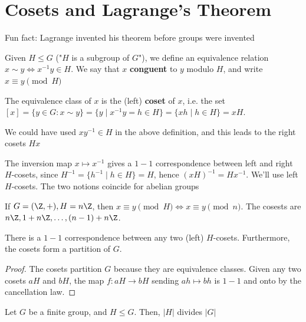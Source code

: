 \section{Cosets and Lagrange's Theorem}

Fun fact: Lagrange invented his theorem before groups were invented

\begin{defn}
    Given $H \leq G$ ("$H$ is a subgroup of $G$"), we define an equivalence relation $x \sim y \iff x^{-1}y \in H$. We say that $x$ \textbf{conguent} to $y$ modulo $H$, and write $x \equiv y \pmod H$

    The equivalence class of $x$ is the (left) \textbf{coset} of $x$, i.e. the set $[x] = \{y \in G: x \sim y\} = \{y \mid x^{-1}y=h \in H\} = \{xh \mid h \in H\}=xH$.
\end{defn}

\begin{notebox*}
    We could have used $xy^{-1}\in H$ in the above definition, and this leads to the right cosets $Hx$
\end{notebox*}

\begin{prop}
    The inversion map $x \mapsto x^{-1}$ gives a $1-1$ correspondence between left and right $H$-cosets, since $H^{-1}=\{h^{-1}\mid h \in H\} = H$, hence $(xH)^{-1}=Hx^{-1}$. We'll use left $H$-cosets. The two notions coincide for abelian groups
\end{prop}

\begin{ex}
    If $G = (\Z, +),H=n\Z$, then $x \equiv y \pmod H \iff x\equiv y \pmod n$. The cosests are $n\Z,1+n\Z,\dots,(n-1)+n\Z$.
\end{ex}

\begin{prop}
    There is a $1-1$ correspondence between any two (left) $H$-cosets. Furthermore, the cosets form a partition of $G$.
\end{prop}

\begin{proof}
    The cosets partition $G$ because they are equivalence classes. Given any two cosets $aH$ and $bH$, the map $f:aH \to bH$ sending $ah \mapsto bh$ is $1-1$ and onto by the cancellation law.
\end{proof}

\begin{thm}
    Let $G$ be a finite group, and $H \leq G$. Then, $|H|$ divides $|G|$
\end{thm}

